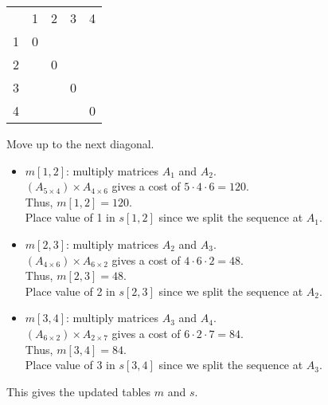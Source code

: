 \documentclass[12pt]{article}
\begin{document}
\begin{center}
\label*{$m$}
\begin{tabular}{ c|c|c|c|c| }
    \multicolumn{1}{c}{}
    & \multicolumn{1}{c}{1}
    & \multicolumn{1}{c}{2}
    & \multicolumn{1}{c}{3}
    & \multicolumn{1}{c}{4}\\

    \cline{2-5}
        1 & 0 &  &  &  \\
    \cline{2-5}
        2 &  & 0 &  &  \\
    \cline{2-5}
        3 &  &  & 0 &  \\
    \cline{2-5}
        4 &  &  &  & 0 \\
    \cline{2-5}
\end{tabular}
\end{center}

Move up to the next diagonal.
\begin{itemize}
    \item $m[1, 2]$: multiply matrices $A_1$ and $A_2$.\\
    $(A_{5 \times 4}) \times A_{4 \times 6}$ gives a cost of $5 \cdot 4 \cdot 6 = 120$. \\
    Thus, $m[1, 2] = 120$.\\
    Place value of 1 in $s[1, 2]$ since we split the sequence at $A_1$.
    
    \item $m[2, 3]$: multiply matrices $A_2$ and $A_3$.\\
    $(A_{4 \times 6}) \times A_{6 \times 2}$ gives a cost of $4 \cdot 6 \cdot 2 = 48$. \\
    Thus, $m[2, 3] = 48$.\\
    Place value of 2 in $s[2, 3]$ since we split the sequence at $A_2$.
    
    \item $m[3, 4]$: multiply matrices $A_3$ and $A_4$.\\
    $(A_{6 \times 2}) \times A_{2 \times 7}$ gives a cost of $6 \cdot 2 \cdot 7 = 84$. \\
    Thus, $m[3, 4] = 84$.\\
    Place value of 3 in $s[3, 4]$ since we split the sequence at $A_3$.
\end{itemize}

\newpage

This gives the updated tables $m$ and $s$.
\end{document}
